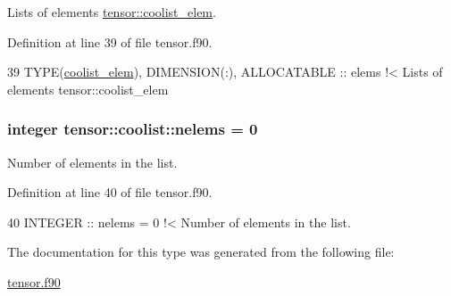 Lists of elements \hyperlink{structtensor_1_1coolist__elem}{tensor\+::coolist\+\_\+elem}. 



Definition at line 39 of file tensor.\+f90.


\begin{DoxyCode}
39      \textcolor{keywordtype}{TYPE}(\hyperlink{structtensor_1_1coolist__elem}{coolist\_elem}), \textcolor{keywordtype}{DIMENSION(:)}, \textcolor{keywordtype}{ALLOCATABLE} :: elems\textcolor{comment}{ !< Lists of elements
       tensor::coolist\_elem}
\end{DoxyCode}
\subsubsection[{\texorpdfstring{nelems}{nelems}}]{\setlength{\rightskip}{0pt plus 5cm}integer tensor\+::coolist\+::nelems = 0}\hypertarget{structtensor_1_1coolist_aac72e7727f1b161da2b9d54e25eb7aae}{}\label{structtensor_1_1coolist_aac72e7727f1b161da2b9d54e25eb7aae}


Number of elements in the list. 



Definition at line 40 of file tensor.\+f90.


\begin{DoxyCode}
40      \textcolor{keywordtype}{INTEGER} :: nelems = 0\textcolor{comment}{ !< Number of elements in the list.}
\end{DoxyCode}


The documentation for this type was generated from the following file\+:\begin{DoxyCompactItemize}
\item 
\hyperlink{tensor_8f90}{tensor.\+f90}\end{DoxyCompactItemize}
